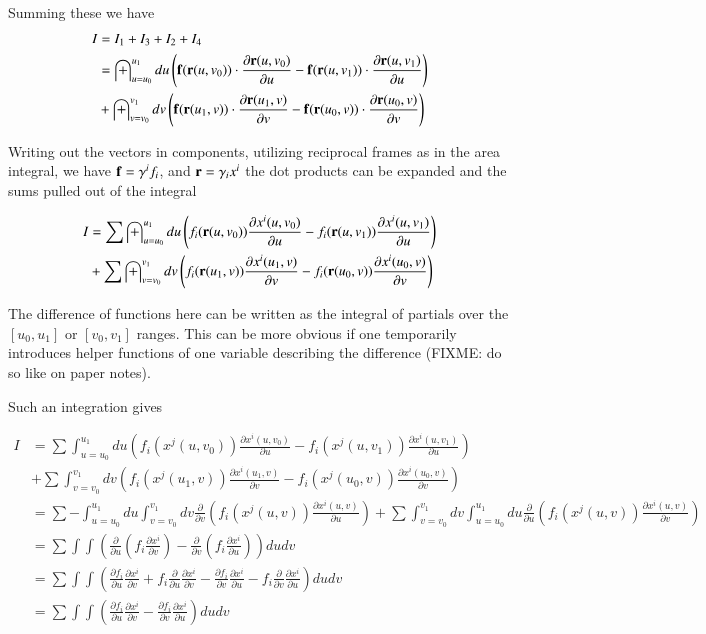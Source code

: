 \documentclass{article}
\newcommand{\PD}[2]{\frac{\partial {#2}}{\partial {#1}}}
\begin{document}
Summing these we have
\begin{align*}
I
&= I_1 + I_3 + I_2 + I_4  \\
&=
\int_{u=u_0}^{u_1} du \left(
\Bf(\Br(u,v_0)) \cdot \PD{u}{\Br(u,v_0)} 
-\Bf(\Br(u,v_1)) \cdot \PD{u}{\Br(u,v_1)} 
\right) \\
&+\int_{v=v_0}^{v_1} dv
\left(
\Bf(\Br(u_1,v)) \cdot \PD{v}{\Br(u_1,v)} 
-\Bf(\Br(u_0,v)) \cdot \PD{v}{\Br(u_0,v)}
\right)
\end{align*}

Writing out the vectors in components, utilizing reciprocal frames as in the area integral,
we have $\mathbf{f} = \gamma^i f_i$, and $\mathbf{r} = \gamma_i x^i$ the dot products can be expanded and the sums
pulled out of the integral

\begin{align*}
I
&=
\sum
\int_{u=u_0}^{u_1} du \left(
f_i(\Br(u,v_0)) \PD{u}{x^i(u,v_0)} 
-f_i(\Br(u,v_1)) \PD{u}{x^i(u,v_1)} 
\right) \\
&+\sum \int_{v=v_0}^{v_1} dv
\left(
f_i(\Br(u_1,v)) \PD{v}{x^i(u_1,v)} 
-f_i(\Br(u_0,v)) \PD{v}{x^i(u_0,v)}
\right) \\
\end{align*}

The difference of functions here can be written as the integral of partials over the
$[u_0,u_1]$ or $[v_0,v_1]$ ranges.  This can be more obvious if one temporarily
introduces helper functions of one variable describing the difference (FIXME: do so like on paper notes).

Such an integration gives

\begin{align*}
I
&=
\sum
\int_{u=u_0}^{u_1} du \left(
f_i(x^j(u,v_0)) \PD{u}{x^i(u,v_0)} 
-f_i(x^j(u,v_1)) \PD{u}{x^i(u,v_1)} 
\right) \\
&+\sum \int_{v=v_0}^{v_1} dv
\left(
f_i(x^j(u_1,v)) \PD{v}{x^i(u_1,v)} 
-f_i(x^j(u_0,v)) \PD{v}{x^i(u_0,v)}
\right) \\
&=
\sum
-\int_{u=u_0}^{u_1} du 
\int_{v=v_0}^{v_1} dv \PD{v}{} \left(f_i(x^j(u,v)) \PD{u}{x^i(u,v)} \right)
+\sum 
\int_{v=v_0}^{v_1} dv
\int_{u=u_0}^{u_1} du \PD{u}{} \left(f_i(x^j(u,v)) \PD{v}{x^i(u,v)} \right) \\
&=
\sum \int\int \left(
\PD{u}{} \left(f_i \PD{v}{x^i} \right) 
-\PD{v}{} \left(f_i \PD{u}{x^i} \right) 
\right) du dv \\
&=
\sum \int\int \left(
\PD{u}{f_i} \PD{v}{x^i}
+f_i \PD{u}{} \PD{v}{x^i}
-\PD{v}{f_i} \PD{u}{x^i}
-f_i \PD{v}{} \PD{u}{x^i}
\right) 
du dv \\
&=
\sum \int\int \left(
\PD{u}{f_i} \PD{v}{x^i}
-\PD{v}{f_i} \PD{u}{x^i}
\right) 
du dv \\
\end{align*}
\end{document}
